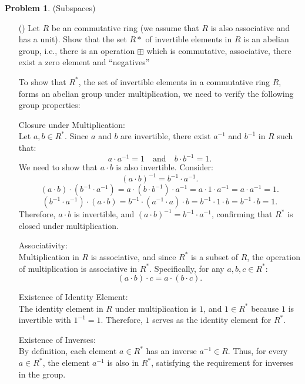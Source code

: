 \documentclass[12pt]{article}
\theoremstyle{definition}
\newtheorem{problem}{Problem}
\newcounter{subq}[problem]
\newenvironment{subproblem}
{\refstepcounter{subq} \begin{itemize} \item[(\alph{subq})]}
{\end{itemize} \medskip}
\begin{document}
\begin{problem}
    (Subspaces)

    \begin{subproblem}
        Let $R$ be an commutative ring (we assume that $R$ is also associative and has a unit). Show that the set $R*$ of invertible elements in $R$ is an 
        abelian group, i.e., there is an operation $\boxplus$ which is commutative, associative, there exist a zero element and “negatives”

        \begin{solution}
            To show that \( R^* \), the set of invertible elements in a commutative ring \( R \), forms an abelian group under multiplication, we need to verify the following group properties:

            Closure under Multiplication:\\
            Let \( a, b \in R^* \). Since \( a \) and \( b \) are invertible, there exist \( a^{-1} \) and \( b^{-1} \) in \( R \) such that:
            \[
            a \cdot a^{-1} = 1 \quad \text{and} \quad b \cdot b^{-1} = 1.
            \]
            We need to show that \( a \cdot b \) is also invertible. Consider:
            \[
            (a \cdot b)^{-1} = b^{-1} \cdot a^{-1}.
            \]
            \[
            (a \cdot b) \cdot (b^{-1} \cdot a^{-1}) = a \cdot (b \cdot b^{-1}) \cdot a^{-1} = a \cdot 1 \cdot a^{-1} = a \cdot a^{-1} = 1.
            \]
            \[        (b^{-1} \cdot a^{-1}) \cdot (a \cdot b) = b^{-1} \cdot (a^{-1} \cdot a) \cdot b = b^{-1} \cdot 1 \cdot b = b^{-1} \cdot b = 1.        \]
            Therefore, \( a \cdot b \) is invertible, and \( (a \cdot b)^{-1} = b^{-1} \cdot a^{-1} \), confirming that \( R^* \) is closed under multiplication.
    
            Associativity:\\
            Multiplication in \( R \) is associative, and since \( R^* \) is a subset of \( R \), the operation of multiplication is associative in \( R^* \). Specifically, for any \( a, b, c \in R^* \):
            \[
            (a \cdot b) \cdot c = a \cdot (b \cdot c).
            \]
        
            Existence of Identity Element:\\
            The identity element in \( R \) under multiplication is \( 1 \), and \( 1 \in R^* \) because \( 1 \) is invertible with \( 1^{-1} = 1 \). Therefore, \( 1 \) serves as the identity element for \( R^* \).
    
            Existence of Inverses:\\
            By definition, each element \( a \in R^* \) has an inverse \( a^{-1} \in R \). Thus, for every \( a \in R^* \), the element \( a^{-1} \) is also in \( R^* \), satisfying the requirement for inverses in the group.
    

\end{solution}
\end{subproblem}
\end{problem}
\end{document}
